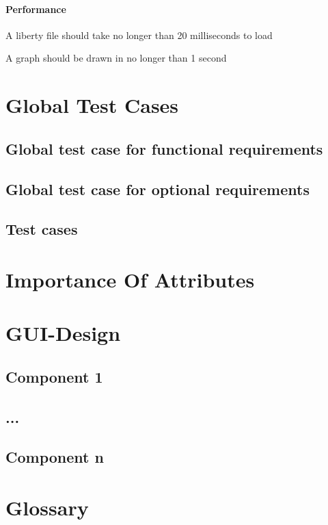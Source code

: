 \documentclass[10pt,a4paper]{report}
\begin{document}
\subsubsection{Performance}
\begin{NFRO-Perf}
    \item A liberty file should take no longer than 20 milliseconds to load
    \item A graph should be drawn in no longer than 1 second
\end{NFRO-Perf}

\chapter{Global Test Cases}
\section{Global test case for functional requirements}
\section{Global test case for optional requirements}
\section{Test cases}
\chapter{Importance Of Attributes}

\chapter{GUI-Design}
\section{Component 1}
\section{...}
\section{Component n}

\chapter{Glossary}
\end{document}
